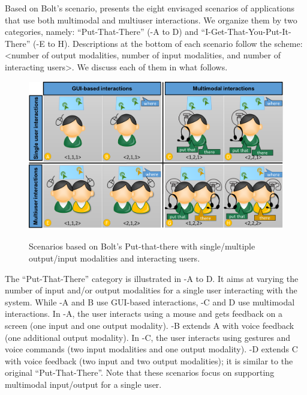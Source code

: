 Based on Bolt’s scenario,  presents the eight envisaged
scenarios of applications that use both multimodal and multiuser interactions.
We organize them by two categories, namely: “Put-That-There”
(-A to D) and “I-Get-That-You-Put-It-There”
(-E to H). Descriptions at the bottom of each scenario follow
the scheme: <number of output modalities, number of input modalities, and number
of interacting users>. We discuss each of them in what follows.

\begin{figure}[!ht]
\begin{center}
    \includegraphics[width=12cm, keepaspectratio]{img/img3.png}
	\caption [Scenarios based on Bolt's Put-that-there]{Scenarios based on
		Bolt's Put-that-there with single/multiple output/input modalities and
		interacting users.}
    \captionvspace
	\label{fig:scenarios}
\end{center}
\end{figure}

The “Put-That-There” category is illustrated in -A to D. It
aims at varying the number of input and/or output modalities for a single user
interacting with the system. While -A and B use GUI-based
interactions, -C and D use multimodal interactions. In
-A, the user interacts using a mouse and gets feedback on a
screen (one input and one output modality). -B extends A with
voice feedback (one additional output modality). In -C, the
user interacts using gestures and voice commands (two input modalities and one
output modality). -D extends C with voice feedback (two input
and two output modalities); it is similar to the original “Put-That-There”. Note
that these scenarios focus on supporting multimodal input/output for a single
user.

